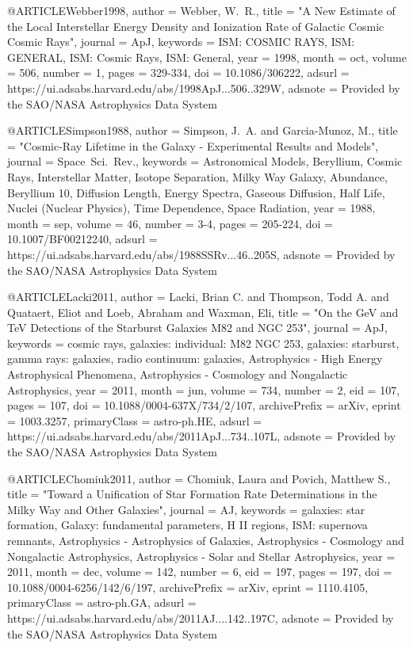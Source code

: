 \documentclass[useAMS,usenatbib]{mnras}
\def\aj{AJ}\def\actaa{Acta Astron.}\def\araa{ARA\&A}\def\apj{ApJ}\def\apjl{ApJ}\def\apjs{ApJS}\def\ao{Appl.~Opt.}\def\apss{Ap\&SS}\def\aap{A\&A}\def\aapr{A\&A~Rev.}\def\aaps{A\&AS}\def\azh{AZh}\def\baas{BAAS}\def\bac{Bull. astr. Inst. Czechosl.}\def\caa{Chinese Astron. Astrophys.}\def\cjaa{Chinese J. Astron. Astrophys.}\def\icarus{Icarus}\def\jcap{J. Cosmology Astropart. Phys.}\def\jrasc{JRASC}\def\mnras{MNRAS}\def\memras{MmRAS}\def\na{New A}\def\nar{New A Rev.}\def\pasa{PASA}\def\pra{Phys.~Rev.~A}\def\prb{Phys.~Rev.~B}\def\prc{Phys.~Rev.~C}\def\prd{Phys.~Rev.~D}\def\pre{Phys.~Rev.~E}\def\prl{Phys.~Rev.~Lett.}\def\pasp{PASP}\def\pasj{PASJ}\def\qjras{QJRAS}\def\rmxaa{Rev. Mexicana Astron. Astrofis.}\def\skytel{S\&T}\def\solphys{Sol.~Phys.}\def\sovast{Soviet~Ast.}\def\ssr{Space~Sci.~Rev.}\def\zap{ZAp}\def\nat{Nature}\def\iaucirc{IAU~Circ.}\def\aplett{Astrophys.~Lett.}\def\apspr{Astrophys.~Space~Phys.~Res.}\def\bain{Bull.~Astron.~Inst.~Netherlands}\def\fcp{Fund.~Cosmic~Phys.}\def\gca{Geochim.~Cosmochim.~Acta}\def\grl{Geophys.~Res.~Lett.}\def\jcp{J.~Chem.~Phys.}\def\jgr{J.~Geophys.~Res.}\def\jqsrt{J.~Quant.~Spec.~Radiat.~Transf.}\def\memsai{Mem.~Soc.~Astron.~Italiana}\def\nphysa{Nucl.~Phys.~A}\def\physrep{Phys.~Rep.}\def\physscr{Phys.~Scr}\def\planss{Planet.~Space~Sci.}\def\procspie{Proc.~SPIE}
\begin{document}
@ARTICLE{Webber1998,
       author = {{Webber}, W.~R.},
        title = "{A New Estimate of the Local Interstellar Energy Density and Ionization Rate of Galactic Cosmic Cosmic Rays}",
      journal = {\apj},
     keywords = {ISM: COSMIC RAYS, ISM: GENERAL, ISM: Cosmic Rays, ISM: General},
         year = 1998,
        month = oct,
       volume = {506},
       number = {1},
        pages = {329-334},
          doi = {10.1086/306222},
       adsurl = {https://ui.adsabs.harvard.edu/abs/1998ApJ...506..329W},
      adsnote = {Provided by the SAO/NASA Astrophysics Data System}
}

@ARTICLE{Simpson1988,
       author = {{Simpson}, J.~A. and {Garcia-Munoz}, M.},
        title = "{Cosmic-Ray Lifetime in the Galaxy - Experimental Results and Models}",
      journal = {\ssr},
     keywords = {Astronomical Models, Beryllium, Cosmic Rays, Interstellar Matter, Isotope Separation, Milky Way Galaxy, Abundance, Beryllium 10, Diffusion Length, Energy Spectra, Gaseous Diffusion, Half Life, Nuclei (Nuclear Physics), Time Dependence, Space Radiation},
         year = 1988,
        month = sep,
       volume = {46},
       number = {3-4},
        pages = {205-224},
          doi = {10.1007/BF00212240},
       adsurl = {https://ui.adsabs.harvard.edu/abs/1988SSRv...46..205S},
      adsnote = {Provided by the SAO/NASA Astrophysics Data System}
}

@ARTICLE{Lacki2011,
       author = {{Lacki}, Brian C. and {Thompson}, Todd A. and {Quataert}, Eliot and
         {Loeb}, Abraham and {Waxman}, Eli},
        title = "{On the GeV and TeV Detections of the Starburst Galaxies M82 and NGC 253}",
      journal = {\apj},
     keywords = {cosmic rays, galaxies: individual: M82 NGC 253, galaxies: starburst, gamma rays: galaxies, radio continuum: galaxies, Astrophysics - High Energy Astrophysical Phenomena, Astrophysics - Cosmology and Nongalactic Astrophysics},
         year = 2011,
        month = jun,
       volume = {734},
       number = {2},
          eid = {107},
        pages = {107},
          doi = {10.1088/0004-637X/734/2/107},
archivePrefix = {arXiv},
       eprint = {1003.3257},
 primaryClass = {astro-ph.HE},
       adsurl = {https://ui.adsabs.harvard.edu/abs/2011ApJ...734..107L},
      adsnote = {Provided by the SAO/NASA Astrophysics Data System}
}

@ARTICLE{Chomiuk2011,
       author = {{Chomiuk}, Laura and {Povich}, Matthew S.},
        title = "{Toward a Unification of Star Formation Rate Determinations in the Milky Way and Other Galaxies}",
      journal = {\aj},
     keywords = {galaxies: star formation, Galaxy: fundamental parameters, H II regions, ISM: supernova remnants, Astrophysics - Astrophysics of Galaxies, Astrophysics - Cosmology and Nongalactic Astrophysics, Astrophysics - Solar and Stellar Astrophysics},
         year = 2011,
        month = dec,
       volume = {142},
       number = {6},
          eid = {197},
        pages = {197},
          doi = {10.1088/0004-6256/142/6/197},
archivePrefix = {arXiv},
       eprint = {1110.4105},
 primaryClass = {astro-ph.GA},
       adsurl = {https://ui.adsabs.harvard.edu/abs/2011AJ....142..197C},
      adsnote = {Provided by the SAO/NASA Astrophysics Data System}
}
\end{document}
